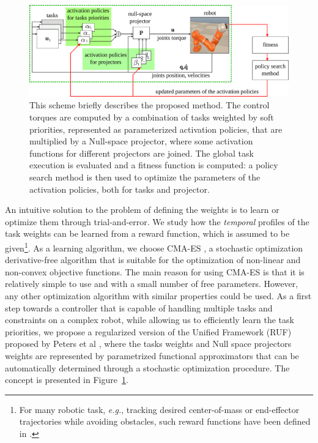 \documentclass[final,5p,twocolumn]{elsarticle}
\begin{document}
\begin{figure}%
\centering
\includegraphics[width=\linewidth]{./sections/WP4/pics_serena/concept_scheme}
\caption{This scheme briefly describes the proposed method. The control torques are computed by a combination of tasks weighted by soft priorities, represented as parameterized activation policies, that are multiplied by a Null-space projector, where some activation functions for different projectors are joined. The global task execution is evaluated and a fitness function is computed: a policy search method is then used to optimize the parameters of the activation policies, both for tasks and projector. }
\label{figure:scheme}
\end{figure}

An intuitive solution to the problem of defining the weights is to learn or optimize them through trial-and-error. 
We study how the \textit{temporal} profiles of the task weights can be learned from a reward function, which is assumed to
be given\footnote{For many robotic task, \textit{e.g.}, tracking desired center-of-mass
or end-effector trajectories while avoiding obstacles, such reward functions
have been defined in \cite{Kober_IJRR_2013}.}. 
As a learning algorithm, we choose CMA-ES \cite{Hansen-2001-ID362}, a stochastic optimization derivative-free algorithm that is suitable for the optimization of non-linear and non-convex objective functions. The main reason for using CMA-ES is that it is relatively simple to use and with a small number of free parameters. However, any other optimization algorithm with similar properties could be used.
As a first step towards a controller that is capable of handling multiple tasks
and constraints on a complex robot, while allowing us to efficiently learn the
task priorities, we propose a regularized version of the Unified Framework (RUF)
proposed by Peters et al \cite{Peters_AR_2008}, where the tasks weights and
Null space projectors weights are represented by parametrized functional
approximators that can be automatically determined through a stochastic
optimization procedure. The concept is presented in Figure~\ref{figure:scheme}.
\end{document}
